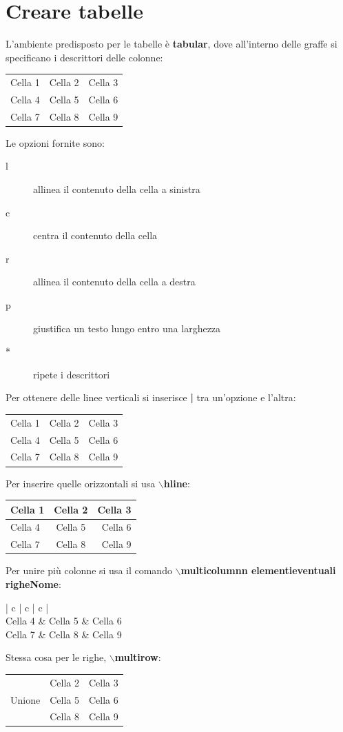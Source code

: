 \documentclass[a4paper, 12pt]{book}
\theoremstyle{plain}
\begin{document}
	\section{Creare tabelle}
	L'ambiente predisposto per le tabelle è \textbf{tabular}, 
	dove all'interno delle graffe si specificano i descrittori delle colonne:
	\begin{center}
		\begin{tabular}{l c r}
			Cella 1 & Cella 2 & Cella 3\\
			Cella 4 & Cella 5 & Cella 6\\
			Cella 7 & Cella 8 & Cella 9\\
		\end{tabular}
	\end{center}
	Le opzioni fornite sono:
	\begin{description}
		\item[l] allinea il contenuto della cella a sinistra
		\item[c] centra il contenuto della cella
		\item[r] allinea il contenuto della cella a destra
		\item[p] giustifica un testo lungo entro una larghezza
		\item[*] ripete i descrittori  
	\end{description}
	Per ottenere delle linee verticali si inserisce \textbf{|} tra 
	un'opzione e l'altra:
	\begin{center}
		\begin{tabular}{l | c | r}
			Cella 1 & Cella 2 & Cella 3\\
			Cella 4 & Cella 5 & Cella 6\\
			Cella 7 & Cella 8 & Cella 9\\
		\end{tabular}
	\end{center}
	Per inserire quelle orizzontali si usa \textbf{$\backslash$hline}:
	\begin{center}
		\begin{tabular}{l c r}
			\hline
			Cella 1 & Cella 2 & Cella 3\\
			\hline
			Cella 4 & Cella 5 & Cella 6\\
			\hline
			Cella 7 & Cella 8 & Cella 9\\
			\hline
		\end{tabular}
	\end{center}
	Per unire più colonne si usa il comando \textbf{$\backslash$multicolumn{n elementi}{eventuali righe}{Nome}}:
	\begin{center}
		\begin{tabular}{| c | c | c |}
			\hline
			\\
			\hline
			Cella 4 & Cella 5 & Cella 6\\
			\hline
			Cella 7 & Cella 8 & Cella 9\\
			\hline
		\end{tabular}
	\end{center}
	Stessa cosa per le righe, \textbf{$\backslash$multirow}:
	\begin{center}
		\begin{tabular}{| c | c | c |}
			\hline
			\multirow{3}{4em}{Unione} & Cella 2 & Cella 3\\
			& Cella 5 & Cella 6\\
			& Cella 8 & Cella 9\\
			\hline
		\end{tabular}
	\end{center} 
	
	
	
\end{document}
